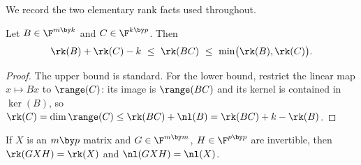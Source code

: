 We record the two elementary rank facts used throughout.

\begin{lemma}\label{lem:sylvester}
  Let $B \in \F^{m \by k}$ and $C \in \F^{k \by p}$.  Then
  \[
    \rk(B) + \rk(C) - k \ \le\ \rk(BC) \ \le\ \min\bigl(\rk(B), \rk(C)\bigr) .
  \]
\end{lemma}

\begin{proof}
  The upper bound is standard.  For the lower bound, restrict the linear map
  $x \mapsto Bx$ to $\range(C)$: its image is $\range(BC)$ and its kernel is
  contained in $\ker(B)$, so
  $\rk(C) = \dim \range(C) \le \rk(BC) + \nl(B) = \rk(BC) + k - \rk(B)$.
\end{proof}

\begin{lemma}\label{lem:rank-invariance}
  If $X$ is an $m \by p$ matrix and $G \in \F^{m \by m}$, $H \in \F^{p \by p}$
  are invertible, then $\rk(GXH) = \rk(X)$ and $\nl(GXH) = \nl(X)$.
\end{lemma}
